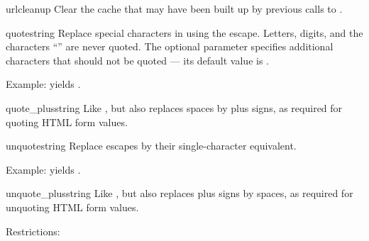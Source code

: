 \begin{funcdesc}{urlcleanup}{}
Clear the cache that may have been built up by previous calls to
.
\end{funcdesc}

\begin{funcdesc}{quote}{string}
Replace special characters in  using the  escape.
Letters, digits, and the characters ``'' are never quoted.
The optional  parameter specifies additional characters
that should not be quoted --- its default value is .

Example:  yields .
\end{funcdesc}

\begin{funcdesc}{quote_plus}{string}
Like , but also replaces spaces by plus signs, as
required for quoting HTML form values.
\end{funcdesc}

\begin{funcdesc}{unquote}{string}
Replace  escapes by their single-character equivalent.

Example:  yields .
\end{funcdesc}

\begin{funcdesc}{unquote_plus}{string}
Like , but also replaces plus signs by spaces, as
required for unquoting HTML form values.
\end{funcdesc}

Restrictions:

